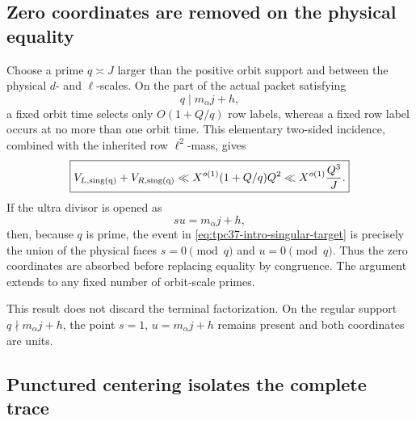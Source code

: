 \subsection{Zero coordinates are removed on the physical equality}

Choose a prime $q\asymp J$ larger than the positive orbit support and
between the physical $d$- and $\ell$-scales.  On the part of the
actual packet satisfying
\begin{equation}
 q\mid m_\alpha j+h,
 \label{eq:tpc37-intro-singular-target}
\end{equation}
a fixed orbit time selects only $O(1+Q/q)$ row labels, whereas a fixed
row label occurs at no more than one orbit time.  This elementary
two-sided incidence, combined with the inherited row $\ell^2$-mass,
gives
\begin{equation}
 \boxed{
 V_{L,\rm sing(q)}+V_{R,\rm sing(q)}
 \ll X^{o(1)}(1+Q/q)Q^2
 \ll X^{o(1)}\frac{Q^3}{J}.}
 \label{eq:tpc37-intro-zero-face-bound}
\end{equation}
If the ultra divisor is opened as
\begin{equation}
 su=m_\alpha j+h,
 \label{eq:tpc37-intro-physical-equality}
\end{equation}
then, because $q$ is prime, the event in
\eqref{eq:tpc37-intro-singular-target} is precisely the union of the
physical faces $s=0\pmod q$ and $u=0\pmod q$.  Thus the zero
coordinates are absorbed before replacing equality by congruence.  The
argument extends to any fixed number of orbit-scale primes.

This result does not discard the terminal factorization.  On the regular
support $q\nmid m_\alpha j+h$, the point $s=1$,
$u=m_\alpha j+h$ remains present and both coordinates are units.

\subsection{Punctured centering isolates the complete trace}


